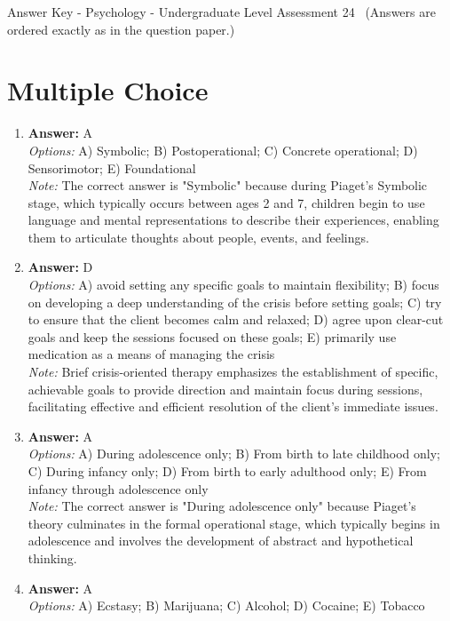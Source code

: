 \documentclass[12pt]{article}
\begin{document}
\begin{center}
Answer Key - Psychology - Undergraduate Level Assessment 24 \
\small (Answers are ordered exactly as in the question paper.)
\end{center}

\section*{Multiple Choice}
\begin{enumerate}[label=\arabic*.]
\item \textbf{Answer:} A
\\ \textit{Options:} A) Symbolic; B) Postoperational; C) Concrete operational; D) Sensorimotor; E) Foundational
\\ \textit{Note:} The correct answer is "Symbolic" because during Piaget's Symbolic stage, which typically occurs between ages 2 and 7, children begin to use language and mental representations to describe their experiences, enabling them to articulate thoughts about people, events, and feelings.
\item \textbf{Answer:} D
\\ \textit{Options:} A) avoid setting any specific goals to maintain flexibility; B) focus on developing a deep understanding of the crisis before setting goals; C) try to ensure that the client becomes calm and relaxed; D) agree upon clear-cut goals and keep the sessions focused on these goals; E) primarily use medication as a means of managing the crisis
\\ \textit{Note:} Brief crisis-oriented therapy emphasizes the establishment of specific, achievable goals to provide direction and maintain focus during sessions, facilitating effective and efficient resolution of the client's immediate issues.
\item \textbf{Answer:} A
\\ \textit{Options:} A) During adolescence only; B) From birth to late childhood only; C) During infancy only; D) From birth to early adulthood only; E) From infancy through adolescence only
\\ \textit{Note:} The correct answer is "During adolescence only" because Piaget's theory culminates in the formal operational stage, which typically begins in adolescence and involves the development of abstract and hypothetical thinking.
\item \textbf{Answer:} A
\\ \textit{Options:} A) Ecstasy; B) Marijuana; C) Alcohol; D) Cocaine; E) Tobacco

\end{enumerate}
\end{document}
